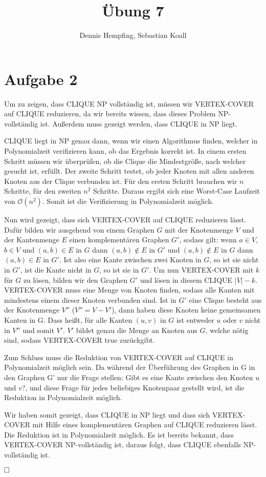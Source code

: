 \documentclass[12pt]{scrartcl}%
\theoremstyle{nonumberplain}
\newcommand{\bO}[1]{\mathcal O(#1)}
\begin{document}
\author{Dennis Hempfing, Sebastian Koall}
\title{Übung 7}
\date{} 
\pagestyle{myheadings}

\maketitle %

\section*{Aufgabe 2}
Um zu zeigen, dass CLIQUE NP vollständig ist, müssen wir VERTEX-COVER auf CLIQUE reduzieren, da wir bereits wissen, dass dieses Problem NP-vollständig ist. Außerdem muss gezeigt werden, dass CLIQUE in NP liegt.

CLIQUE liegt in NP genau dann, wenn wir einen Algorithmus finden, welcher in Polynomialzeit verifizieren kann, ob das Ergebnis korrekt ist. In einem ersten Schritt müssen wir überprüfen, ob die Clique die Mindestgröße, nach welcher gesucht ist, erfüllt. Der zweite Schritt testet, ob jeder Knoten mit allen anderen Knoten aus der Clique verbunden ist. Für den ersten Schritt brauchen wir $n$ Schritte, für den zweiten $n^2$ Schritte. Daraus ergibt sich eine Worst-Case Laufzeit von $\bO{n^2}$. Somit ist die Verifizierung in Polynomialzeit möglich.

Nun wird gezeigt, dass sich VERTEX-COVER auf CLIQUE reduzieren lässt. Dafür bilden wir ausgehend von einem Graphen $G$ mit der Knotenmenge $V$ und der Kantenmenge $E$ einen komplementären Graphen $G'$, sodass gilt: wenn $a \in V$, $b \in V$ und $(a,b) \in E$ in $G$ dann $(a,b) \notin E$ in $G'$ und $(a,b) \notin E$ in $G$ dann $(a,b) \in E$ in $G'$. Ist also eine Kante zwischen zwei Knoten in $G$, so ist sie nicht in $G'$, ist die Kante nicht in $G$, so ist sie in $G'$. Um nun VERTEX-COVER mit $k$ für $G$ zu lösen, bilden wir den Graphen $G'$ und lösen in diesem CLIQUE $|V| - k$. VERTEX-COVER muss eine Menge von Knoten finden, sodass alle Kanten mit mindestens einem dieser Knoten verbunden sind. Ist in $G'$ eine Clique besteht aus der Knotenmenge $V''$ ($V'' = V - V'$), dann haben diese Knoten keine gemeinsamen Kanten in G. Dass heißt, für alle Kanten $(u,v)$ in $G$ ist entweder $u$ oder $v$ nicht in $V''$ und somit $V'$. $V'$ bildet genau die Menge an Knoten aus $G$, welche nötig sind, sodass VERTEX-COVER true zurückgibt.

Zum Schluss muss die Reduktion von VERTEX-COVER auf CLIQUE in Polynomialzeit möglich sein. Da während der Überführung des Graphen in G in den Graphen G' nur die Frage stellen: Gibt es eine Kante zwischen den Knoten $u$ und $v$?, und diese Frage für jedes beliebiges Knotenpaar gestellt wird, ist die Reduktion in Polynomialzeit möglich.

Wir haben somit gezeigt, dass CLIQUE in NP liegt und dass sich VERTEX-COVER mit Hilfe eines komplementären Graphen auf CLIQUE reduzieren lässt. Die Reduktion ist in Polynomialzeit möglich. Es ist bereits bekannt, dass VERTEX-COVER NP-vollständig ist, daraus folgt, dass CLIQUE ebenfalls NP-vollständig ist.

$\hfill \square$ 
\end{document}

